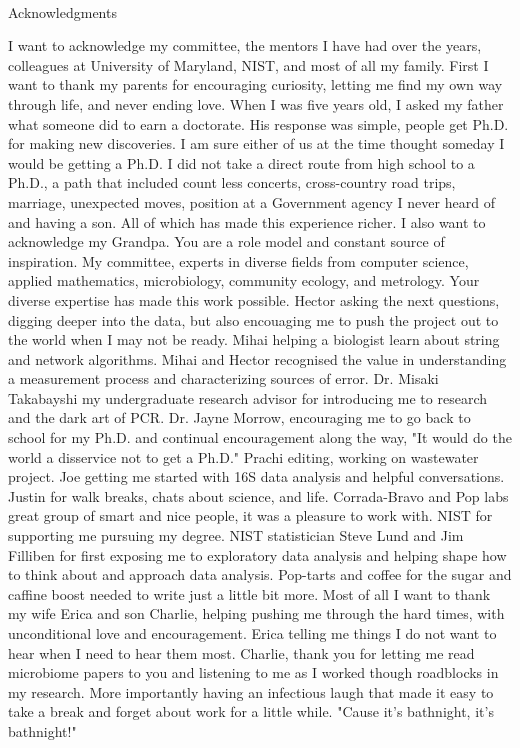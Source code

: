 
\renewcommand{\baselinestretch}{2}
\small\normalsize
\hbox{\ }

\vspace{-.65in}

\begin{center}
\large{Acknowledgments}
\end{center}

\vspace{1ex}


I want to acknowledge my committee, the mentors I have had over the years, colleagues at University of Maryland, NIST, and most of all my family.
First I want to thank my parents for encouraging curiosity, letting me find my own way through life, and never ending love.
When I was five years old, I asked my father what someone did to earn a doctorate.
His response was simple, people get Ph.D. for making new discoveries.
I am sure either of us at the time thought someday I would be getting a Ph.D.
I did not take a direct route from high school to a Ph.D., a path that included count less concerts, cross-country road trips, marriage, unexpected moves, position at a Government agency I never heard of and having a son. All of which has made this experience richer.
I also want to acknowledge my Grandpa.
You are a role model and constant source of inspiration.
My committee, experts in diverse fields from computer science, applied mathematics, microbiology, community ecology, and metrology.
Your diverse expertise has made this work possible.
Hector asking the next questions, digging deeper into the data, but also encouaging me to push the project out to the world when I may not be ready. 
Mihai helping a biologist learn about string and network algorithms. 
Mihai and Hector recognised the value in understanding a measurement process and characterizing sources of error. 
Dr. Misaki Takabayshi my undergraduate research advisor for introducing me to research and the dark art of PCR.
Dr. Jayne Morrow, encouraging me to go back to school for my Ph.D. and continual encouragement along the way, "It would do the world a disservice not to get a Ph.D."
Prachi editing, working on wastewater project.
Joe getting me started with 16S data analysis and helpful conversations. 
Justin for walk breaks, chats about science, and life.
Corrada-Bravo and Pop labs great group of smart and nice people, it was a pleasure to work with.
NIST for supporting me pursuing my degree.
NIST statistician Steve Lund and Jim Filliben for first exposing me to exploratory data analysis and helping shape how to think about and approach data analysis.
Pop-tarts and coffee for the sugar and caffine boost needed to write just a little bit more.
Most of all I want to thank my wife Erica and son Charlie, helping pushing me through the hard times, with unconditional love and encouragement.
Erica telling me things I do not want to hear when I need to hear them most.
Charlie, thank you for letting me read microbiome papers to you and listening to me as I worked though roadblocks in my research.
More importantly having an infectious laugh that made it easy to take a break and forget about work for a little while.
"Cause it's bathnight, it's bathnight!"
